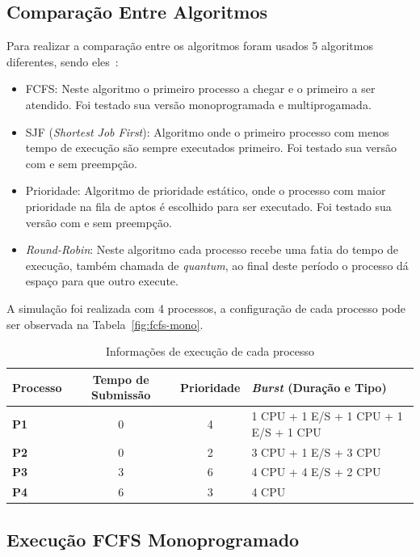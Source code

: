 \documentclass[
	12pt,				%
	oneside,   	        %
	a4paper,			%
	english,			%
	french,				%
	spanish,			%
	brazil,				%
	]{pacotes/abntex2}
\begin{document}
\subsection{Comparação Entre Algoritmos}
\label{subsec:algoritmos}

Para realizar a comparação entre os algoritmos foram usados 5 algoritmos diferentes, sendo eles~\cite{maziero2019}:

\begin{itemize}
  \item FCFS: Neste algoritmo o primeiro processo a chegar e o primeiro a ser atendido. Foi testado sua versão monoprogramada e multiprogamada.
  \item SJF (\textit{Shortest Job First}): Algoritmo onde o primeiro processo com menos tempo de execução são sempre executados primeiro. Foi testado sua versão com e sem preempção.
  \item Prioridade: Algoritmo de prioridade estático, onde o processo com maior prioridade na fila de aptos é escolhido para ser executado. Foi testado sua versão com e sem preempção.
  \item \textit{Round-Robin}: Neste algoritmo cada processo recebe uma fatia do tempo de execução, também chamada de \textit{quantum}, ao final deste período o processo dá espaço para que outro execute.
\end{itemize}

A simulação foi realizada com 4 processos, a configuração de cada processo pode ser observada na Tabela~\ref{fig:fcfs-mono}.

\begin{table}[H]
\centering
\caption{Informações de execução de cada processo}
\label{tab:processos}
\footnotesize
\begin{tabular}{l|c|c|l}
\toprule
\textbf{Processo} & \textbf{Tempo de Submissão} & \textbf{Prioridade} & \textbf{\textit{Burst} (Duração e Tipo)} \\ 
\midrule
\textbf{P1} & 0  & 4 & 1 CPU + 1 E/S + 1 CPU + 1 E/S + 1 CPU \\
\textbf{P2} & 0  & 2 & 3 CPU + 1 E/S + 3 CPU \\
\textbf{P3} & 3  & 6 & 4 CPU + 4 E/S + 2 CPU \\
\textbf{P4} & 6  & 3 & 4 CPU \\
\bottomrule
\end{tabular}
\end{table}

\subsection{Execução FCFS Monoprogramado}
\label{subsubsec:fcfs_mono}
\end{document}

